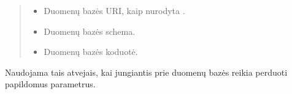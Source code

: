 \documentclass[letterpaper,10pt,lithuanian]{sphinxmanual}
\begin{document}
\begin{fulllineitems}

\pysigstartsignatures
\pysigline
{}
\pysigstopsignatures{}

\begin{fulllineitems}
\label{\detokenize{saltiniai:connect}}
\pysigstartsignatures
\pysiglinewithargsret
{}
{\sphinxparamcomma {}\sphinxparamcomma {}}
{}
\pysigstopsignatures\begin{quote}\begin{description}
\begin{itemize}
\item {} 
\sphinxAtStartPar
{} \sphinxhyphen{}\sphinxhyphen{} Duomenų bazės URI, kaip nurodyta {\hyperref[\detokenize{saltiniai:sql-resource-source}]{}}.

\item {} 
\sphinxAtStartPar
{} \sphinxhyphen{}\sphinxhyphen{} Duomenų bazės schema.

\item {} 
\sphinxAtStartPar
{} \sphinxhyphen{}\sphinxhyphen{} Duomenų bazės koduotė.

\end{itemize}

\end{description}\end{quote}

\sphinxAtStartPar
Naudojama tais atvejais, kai jungiantis prie duomenų bazės reikia
perduoti papildomus parametrus.

\end{fulllineitems}


\end{fulllineitems}
\end{document}
